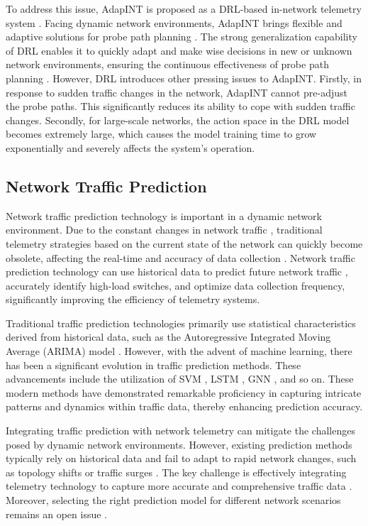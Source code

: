 \documentclass[journal]{IEEEtran}
\begin{document}
To address this issue, AdapINT is proposed as a DRL-based in-network telemetry system \cite{AdapINT}. Facing dynamic network environments, AdapINT brings flexible and adaptive solutions for probe path planning \cite{20}. The strong generalization capability of DRL enables it to quickly adapt and make wise decisions in new or unknown network environments, ensuring the continuous effectiveness of probe path planning \cite{23}. However, DRL introduces other pressing issues to AdapINT. Firstly, in response to sudden traffic changes in the network, AdapINT cannot pre-adjust the probe paths. This significantly reduces its ability to cope with sudden traffic changes. Secondly, for large-scale networks, the action space in the DRL model becomes extremely large, which causes the model training time to grow exponentially and severely affects the system's operation.


\subsection{Network Traffic Prediction}


Network traffic prediction technology is important in a dynamic network environment. Due to the constant changes in network traffic \cite{16}, traditional telemetry strategies based on the current state of the network can quickly become obsolete, affecting the real-time and accuracy of data collection \cite{15}. Network traffic prediction technology can use historical data to predict future network traffic \cite{17}, accurately identify high-load switches, and optimize data collection frequency, significantly improving the efficiency of telemetry systems.


Traditional traffic prediction technologies primarily use statistical characteristics derived from historical data, such as the Autoregressive Integrated Moving Average (ARIMA) model \cite{35}. However, with the advent of machine learning, there has been a significant evolution in traffic prediction methods. These advancements include the utilization of SVM \cite{36}, LSTM \cite{37}, GNN \cite{38}, and so on. These modern methods have demonstrated remarkable proficiency in capturing intricate patterns and dynamics within traffic data, thereby enhancing prediction accuracy.


Integrating traffic prediction with network telemetry can mitigate the challenges posed by dynamic network environments. However, existing prediction methods typically rely on historical data and fail to adapt to rapid network changes, such as topology shifts or traffic surges \cite{40}. The key challenge is effectively integrating telemetry technology to capture more accurate and comprehensive traffic data \cite{39}. Moreover, selecting the right prediction model for different network scenarios remains an open issue \cite{27}.
\end{document}
